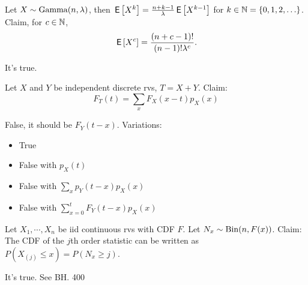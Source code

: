 \documentclass[tf-tutorial-all.tex]{subfiles}
\begin{document}
\begin{truefalse}
Let $X \sim \mathrm{Gamma}(n,\lambda)$, then $\,\mathsf{E}\left[X^{k}\right] = \frac{n+k-1}{\lambda} \,\mathsf{E}\left[X^{k-1}\right]$ for $k \in \mathbb{N} = \{0, 1, 2, \ldots\}$.
Claim, for $c\in \mathbb{N}$,
\begin{equation}
\,\mathsf{E}\left[X^{c}\right] =  \frac{(n+c-1)!}{(n-1)!\lambda^{c}}.
\end{equation}
\begin{solution}
    It's true.
\end{solution}
\end{truefalse}

\begin{truefalse}
  Let $X$ and $Y$ be independent discrete rvs, $T = X + Y$. Claim:
  $$F_T(t) = \sum_x F_X(x - t) p_X(x)$$
\begin{solution}
  False, it should be $F_Y(t - x)$.
  Variations:
  \begin{itemize}
  \item True
  \item False with $p_X(t)$
  \item False with $\sum_x p_Y(t -  x) p_X(x)$
  \item False with $\sum_{x=0}^t F_Y(t - x) p_X(x)$
  \end{itemize}
\end{solution}
\end{truefalse}

\begin{truefalse}
Let $X_1, \cdots, X_n$ be iid continuous rvs with CDF $F$.
Let $N_{x} \sim \mathrm{Bin}(n,F(x))$.
Claim: The CDF of the $j$th order statistic can be written as $P(X_{(j)} \leq x) = P(N_{x} \geq j)$.
\begin{solution}
It's true. See BH. 400
\end{solution}
\end{truefalse}
\end{document}
